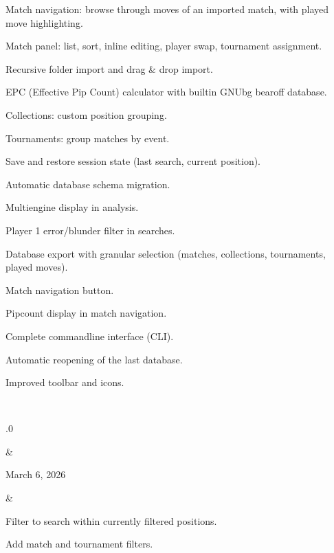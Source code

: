\documentclass[letterpaper,10pt,english]{sphinxmanual}
\begin{document}
\begin{savenotes}
\begin{longtable}{}
\begin{varwidth}[t]{}
\sphinxAtStartPar
Match navigation: browse through moves of an imported match, with played move highlighting.

\sphinxAtStartPar
Match panel: list, sort, inline editing, player swap, tournament assignment.

\sphinxAtStartPar
Recursive folder import and drag \& drop import.

\sphinxAtStartPar
EPC (Effective Pip Count) calculator with built\sphinxhyphen{}in GNUbg bearoff database.

\sphinxAtStartPar
Collections: custom position grouping.

\sphinxAtStartPar
Tournaments: group matches by event.

\sphinxAtStartPar
Save and restore session state (last search, current position).

\sphinxAtStartPar
Automatic database schema migration.

\sphinxAtStartPar
Multi\sphinxhyphen{}engine display in analysis.

\sphinxAtStartPar
Player 1 error/blunder filter in searches.

\sphinxAtStartPar
Database export with granular selection (matches, collections, tournaments, played moves).

\sphinxAtStartPar
Match navigation button.

\sphinxAtStartPar
Pipcount display in match navigation.

\sphinxAtStartPar
Complete command\sphinxhyphen{}line interface (CLI).

\sphinxAtStartPar
Automatic reopening of the last database.

\sphinxAtStartPar
Improved toolbar and icons.
\sphinxbeforeendvarwidth
\end{varwidth}%
\\
\sphinxhline\begin{varwidth}[t]{}
.0
\sphinxbeforeendvarwidth
\end{varwidth}%
&\begin{varwidth}[t]{}
\sphinxAtStartPar
March 6, 2026
\sphinxbeforeendvarwidth
\end{varwidth}%
&\begin{varwidth}[t]{}
\sphinxAtStartPar
Filter to search within currently filtered positions.

\sphinxAtStartPar
Add match and tournament filters.


\end{varwidth}
\end{longtable}
\end{savenotes}
\end{document}
